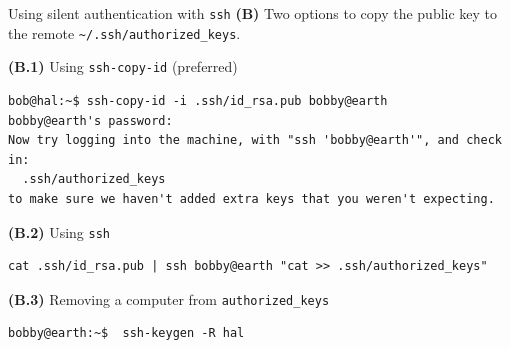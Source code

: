 \begin{frame}[t,fragile]{Using silent authentication with \alert{\texttt{ssh}} \textbf{(B)}}
    {\footnotesize  Two options to copy the public key to the remote \texttt{\textasciitilde/.ssh/authorized\_keys}.}
  \begin{block}{\textbf{(B.1)}  Using \texttt{\alert{ssh-copy-id}} (preferred)}
{\scriptsize
  \begin{lstlisting}
bob@hal:~$ ssh-copy-id -i .ssh/id_rsa.pub bobby@earth
bobby@earth's password: 
Now try logging into the machine, with "ssh 'bobby@earth'", and check in:
  .ssh/authorized_keys
to make sure we haven't added extra keys that you weren't expecting.
  \end{lstlisting}%
}
  \end{block}
  \begin{block}{\textbf{(B.2)}  Using \texttt{\alert{ssh}}}
{\scriptsize
  \begin{lstlisting}
cat .ssh/id_rsa.pub | ssh bobby@earth "cat >> .ssh/authorized_keys"
\end{lstlisting}
}

  \end{block}
  \begin{block}{\textbf{(B.3)}  Removing a computer from  \texttt{authorized\_keys}}
{\scriptsize
  \begin{lstlisting}
bobby@earth:~$  ssh-keygen -R hal
  \end{lstlisting}
}

  \end{block}
  
\end{frame}
